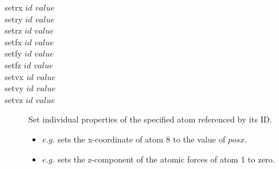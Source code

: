 \begin{description}
	\item[setrx $id$ $value$\its]
	\item[setry $id$ $value$\its]
	\item[setrz $id$ $value$\its]
	\item[setfx $id$ $value$\its]
	\item[setfy $id$ $value$\its]
	\item[setfz $id$ $value$\its]
	\item[setvx $id$ $value$\its]
	\item[setvy $id$ $value$\its]
	\item[setvz $id$ $value$\its]
	Set individual properties of the specified atom referenced by its ID. 
	\begin{itemize}
		\item $e.g.$  sets the x-coordinate of atom 8 to the value of $posx$.
		\item $e.g.$  sets the z-component of the atomic forces of atom 1 to zero.
	\end{itemize}

\end{description}



